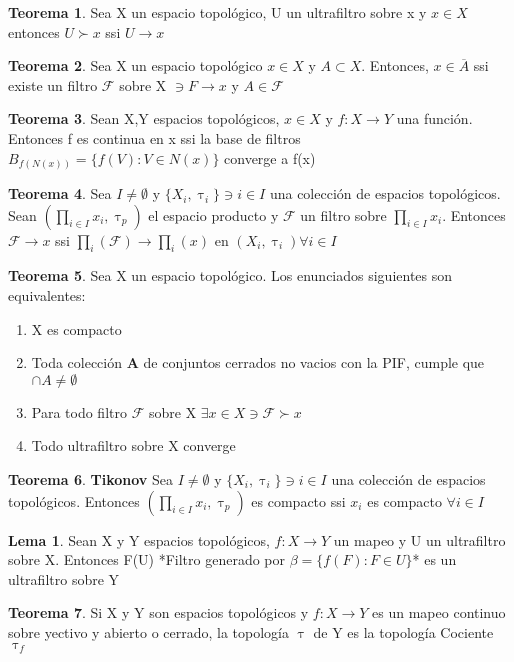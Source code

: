 \documentclass{article}
\theoremstyle{definition}
\newtheorem{theorem}{Teorema}[section]
\newtheorem{lemma}{Lema}[section]
\begin{document}
\begin{theorem}
	Sea X un espacio topológico, U un ultrafiltro sobre x y $x\in X$ entonces $U \succ x$ ssi $U\to x$
\end{theorem}
\begin{theorem}
	Sea X un espacio topológico $x\in X$ y $A\subset X$. Entonces, $x\in\overline{A}$ ssi existe un filtro $\mathcal{F}$ sobre X $\ni F\to x$ y $A\in\mathcal{F}$
\end{theorem}
\begin{theorem}
	Sean X,Y espacios topológicos, $x\in X$  y $f:X\to Y$ una función. Entonces f es continua en x ssi la base de filtros $B_{f(N(x))}=\{f(V):V\in N(x)\}$ converge a f(x)
\end{theorem}
\begin{theorem}
	Sea $I\neq\emptyset$ y $\{X_i,\uptau_i\}\ni i\in I$ una colección de espacios topológicos. Sean $(\prod_{i\in I}x_i,\uptau_p)$ el espacio producto y $\mathcal{F}$ un filtro sobre $\prod_{i\in I}x_i$. Entonces $\mathcal{F}\to x$ ssi $\prod_{i}(\mathcal{F})\to \prod_i(x)$ en $(X_i,\uptau_i) \forall i\in I$
\end{theorem}
\begin{theorem}
	Sea X un espacio topológico. Los enunciados siguientes son equivalentes:
	\begin{enumerate}
		\item X es compacto
		\item Toda colección \textbf{A} de conjuntos cerrados no vacios con la PIF, cumple que $\cap A\neq\emptyset$
		\item Para todo filtro $\mathcal{F}$ sobre X $\exists x\in X\ni \mathcal{F} \succ x$
		\item Todo ultrafiltro sobre X converge
	\end{enumerate}
\end{theorem}
\begin{theorem}\textbf{Tikonov}
	Sea $I\neq\emptyset$ y $\{X_i,\uptau_i\}\ni i\in I$ una colección de espacios topológicos. Entonces $(\prod_{i\in I}x_i,\uptau_p)$ es compacto ssi $x_i$ es compacto $\forall i \in I$
\end{theorem}
\begin{lemma}
	Sean X y Y espacios topológicos, $f:X\to Y$ un mapeo y U un ultrafiltro sobre X. Entonces F(U) *Filtro generado por $\beta = \{f(F):F\in U\}$* es un ultrafiltro sobre Y
\end{lemma}
\begin{theorem}
	Si X y Y son espacios topológicos y $f:X\to Y$ es un mapeo continuo sobre yectivo y abierto o cerrado, la topología $\uptau$ de Y es la topología Cociente $\uptau_f$
\end{theorem}
\end{document}
